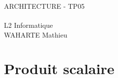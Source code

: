 \documentclass[12pt]{base}
\date{ }
\begin{document}
\begin{titlepage}

\begin{center}
    \vspace*{5cm}
    \huge ARCHITECTURE - TP05\\
    \text{ }\\
    \LARGE L2 Informatique\\
    \vfill
    \LARGE WAHARTE Mathieu\\
\end{center}

\end{titlepage}

\newpage

\section{Produit scalaire}




\end{document}
